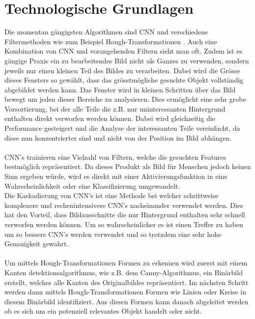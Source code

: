 \section{Technologische Grundlagen}
\label{sec:technicalBase}
Die momentan gängigsten Algorithmen sind \gls{CNN} \parencite{li2015convolutional} und verschiedene Filtermethoden wie zum Beispiel Hough-Transformationen \parencite{ye2015new}. Auch eine Kombination von \gls{CNN} und vorangehenden Filtern sieht man oft. Zudem ist es gängige Praxis ein zu bearbeitendes Bild nicht als Ganzes zu verwenden, sondern jeweils nur einen kleinen Teil des Bildes zu verarbeiten. Dabei wird die Grösse dieses Fensters so gewählt, dass das grösstmögliche gesuchte Objekt vollständig abgebildet werden kann. Das Fenster wird in kleinen Schritten über das Bild bewegt um jeden dieser Bereiche zu analysieren. Dies ermöglicht eine sehr grobe Vorsortierung, bei der alle Teile die z.B. nur uninteressanten Hintergrund enthalten direkt verworfen werden können. Dabei wird gleichzeitig die Performance gesteigert und die Analyse der interessanten Teile vereinfacht, da diese nun konzentrierter sind und nicht von der Position im Bild abhängen.\\
\\
\gls{CNN}’s trainieren eine Vielzahl von Filtern, welche die gesuchten Features bestmöglich repräsentiert. Da dieses Produkt als Bild für Menschen jedoch keinen Sinn ergeben würde, wird es direkt mit einer Aktivierungsfunktion in eine Wahrscheinlichkeit oder eine Klassifizierung umgewandelt.\\
Die Kaskadierung von \gls{CNN}’s ist eine Methode bei welcher schrittweise komplexere und rechenintensivere \gls{CNN}’s nacheinander verwendet werden. Dies hat den Vorteil, dass Bildausschnitte die nur Hintergrund enthalten sehr schnell verworfen werden können. Um so wahrscheinlicher es ist einen Treffer zu haben um so bessere \gls{CNN}’s werden verwendet und so trotzdem eine sehr hohe Genauigkeit gewahrt.\\
\\
Um mittels Hough-Transformationen Formen zu erkennen wird zuerst mit einem Kanten detektionsalgorithmus, wie z.B. dem Canny-Algorithmus, ein Binärbild erstellt, welches alle Kanten des Originalbildes repräsentiert. Im nächsten Schritt werden dann mittels Hough-Transformationen Formen wie Linien oder Kreise in diesem Binärbild identifiziert. Aus diesen Formen kann danach abgeleitet werden ob es sich um ein potenziell relevantes Objekt handelt oder nicht.\\
